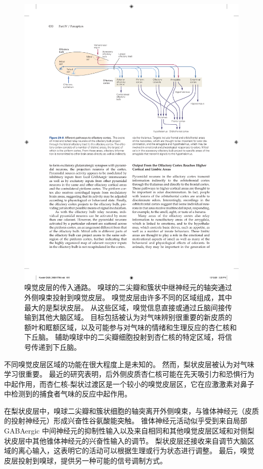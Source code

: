 \begin{figure}[htbp]
	\centering
	\includegraphics[width=0.9\linewidth]{chap29/fig_29_8}
	\caption{嗅觉皮层的传入通路。 嗅球的二尖瓣和簇状中继神经元的轴突通过外侧嗅束投射到嗅觉皮层。 嗅觉皮层由许多不同的区域组成，其中最大的是梨状皮层。 从这些区域，嗅觉信息直接或通过丘脑间接传输到其他大脑区域。 目标包括被认为对气味辨别很重要的新皮质的额叶和眶额区域，以及可能参与对气味的情绪和生理反应的杏仁核和下丘脑。 辅助嗅球中的二尖瓣细胞投射到杏仁核的特定区域，将信号传递到下丘脑。}
	\label{fig:29_8}
\end{figure}


不同嗅觉皮层区域的功能在很大程度上是未知的。
然而，梨状皮层被认为对气味学习很重要。
最近的研究表明，后外侧皮质杏仁核可能在先天吸引力和恐惧行为中起作用，而杏仁核-梨状过渡区是一个较小的嗅觉皮层区，它在应激激素对鼻子中检测到的捕食者气味的反应中起作用。


在梨状皮层中，嗅球二尖瓣和簇状细胞的轴突离开外侧嗅束，与锥体神经元（皮质的投射神经元）形成兴奋性谷氨酸能突触。
锥体神经元活动似乎受到来自局部 GABAergic 中间神经元的抑制性输入以及来自相同和其他嗅觉皮层区域和对侧梨状皮层中其他锥体神经元的兴奋性输入的调节。
梨状皮层还接收来自调节大脑区域的离心输入，这表明它的活动可以根据生理或行为状态进行调整。
最后，嗅觉皮层投射到嗅球，提供另一种可能的信号调制方式。


